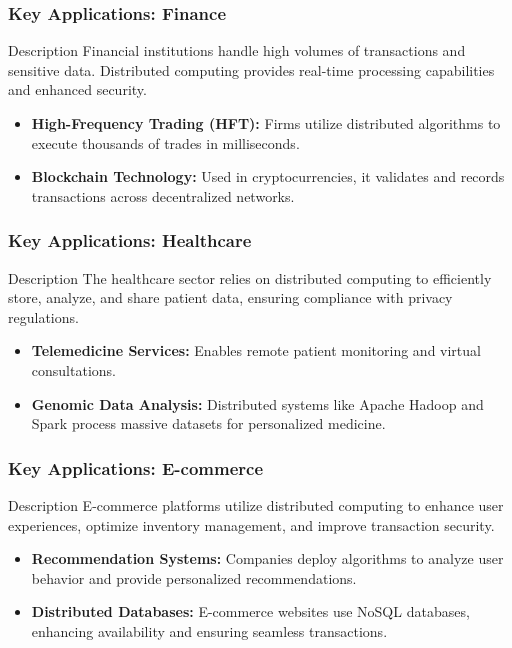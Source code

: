 \documentclass[aspectratio=169]{beamer}
\begin{document}
\begin{frame}[fragile]
    \frametitle{Key Applications: Finance}
    \begin{block}{Description}
        Financial institutions handle high volumes of transactions and sensitive data. Distributed computing provides real-time processing capabilities 
        and enhanced security.
    \end{block}
    \begin{itemize}
        \item \textbf{High-Frequency Trading (HFT):} Firms utilize distributed algorithms to execute thousands of trades in milliseconds.
        \item \textbf{Blockchain Technology:} Used in cryptocurrencies, it validates and records transactions across decentralized networks.
    \end{itemize}
\end{frame}

\begin{frame}[fragile]
    \frametitle{Key Applications: Healthcare}
    \begin{block}{Description}
        The healthcare sector relies on distributed computing to efficiently store, analyze, and share patient data, ensuring compliance with privacy regulations.
    \end{block}
    \begin{itemize}
        \item \textbf{Telemedicine Services:} Enables remote patient monitoring and virtual consultations.
        \item \textbf{Genomic Data Analysis:} Distributed systems like Apache Hadoop and Spark process massive datasets for personalized medicine.
    \end{itemize}
\end{frame}

\begin{frame}[fragile]
    \frametitle{Key Applications: E-commerce}
    \begin{block}{Description}
        E-commerce platforms utilize distributed computing to enhance user experiences, optimize inventory management, and improve transaction security.
    \end{block}
    \begin{itemize}
        \item \textbf{Recommendation Systems:} Companies deploy algorithms to analyze user behavior and provide personalized recommendations.
        \item \textbf{Distributed Databases:} E-commerce websites use NoSQL databases, enhancing availability and ensuring seamless transactions.
    \end{itemize}
\end{frame}
\end{document}
